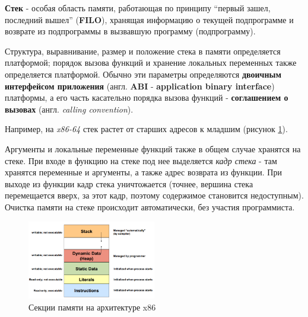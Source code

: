 \textbf{Стек} - особая область памяти, работающая по принципу ``первый
зашел, последний вышел'' (\textbf{FILO}), хранящая информацию о текущей
подпрограмме и возврате из подпрограммы в вызвавшую программу
(подпрограмму).

Структура, выравнивание, размер и положение стека в памяти определяется
платформой; порядок вызова функций и хранение локальных переменных также
определяется платформой. Обычно эти параметры определяются
\textbf{двоичным интерфейсом приложения} (англ. \textbf{ABI} -
\textbf{application binary interface}) платформы, а его часть касательно
порядка вызова функций - \textbf{соглашением о вызовах} (англ.
\emph{calling convention}).

Например, на \emph{x86-64} стек растет от старших адресов к младшим (рисунок \ref{fig:x86mem}).

Аргументы и локальные переменные функций также в общем случае хранятся
на стеке. При входе в функцию на стеке под нее выделяется \emph{кадр
стека} - там хранятся переменные и аргументы, а также адрес возврата из
функции. При выходе из функции кадр стека уничтожается (точнее, вершина
стека перемещается вверх, за этот кадр, поэтому содержимое становится
недоступным). Очистка памяти на стеке происходит автоматически, без
участия программиста.

\begin{figure}[h]
\centering
\includegraphics[width=0.5\textwidth]{./res/mem.png}
\caption{Секции памяти на архитектуре x86}
\label{fig:x86mem}
\end{figure}
